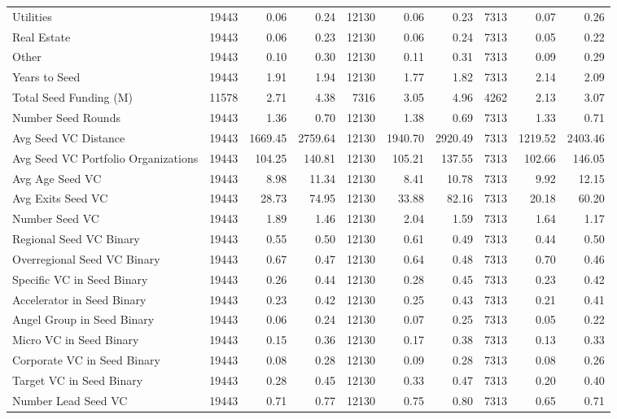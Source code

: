 {\begin{table}[!h]
{\begin{tabular}[t]{lrrrrrrrrr}
Utilities & 19443 & 0.06 & 0.24 & 12130 & 0.06 & 0.23 & 7313 & 0.07 & 0.26\\
Real Estate & 19443 & 0.06 & 0.23 & 12130 & 0.06 & 0.24 & 7313 & 0.05 & 0.22\\
Other & 19443 & 0.10 & 0.30 & 12130 & 0.11 & 0.31 & 7313 & 0.09 & 0.29\\
Years to Seed & 19443 & 1.91 & 1.94 & 12130 & 1.77 & 1.82 & 7313 & 2.14 & 2.09\\
\addlinespace
Total Seed Funding (M) & 11578 & 2.71 & 4.38 & 7316 & 3.05 & 4.96 & 4262 & 2.13 & 3.07\\
Number Seed Rounds & 19443 & 1.36 & 0.70 & 12130 & 1.38 & 0.69 & 7313 & 1.33 & 0.71\\
Avg Seed VC Distance & 19443 & 1669.45 & 2759.64 & 12130 & 1940.70 & 2920.49 & 7313 & 1219.52 & 2403.46\\
Avg Seed VC Portfolio Organizations & 19443 & 104.25 & 140.81 & 12130 & 105.21 & 137.55 & 7313 & 102.66 & 146.05\\
Avg Age Seed VC & 19443 & 8.98 & 11.34 & 12130 & 8.41 & 10.78 & 7313 & 9.92 & 12.15\\
\addlinespace
Avg Exits Seed VC & 19443 & 28.73 & 74.95 & 12130 & 33.88 & 82.16 & 7313 & 20.18 & 60.20\\
Number Seed VC & 19443 & 1.89 & 1.46 & 12130 & 2.04 & 1.59 & 7313 & 1.64 & 1.17\\
Regional Seed VC Binary & 19443 & 0.55 & 0.50 & 12130 & 0.61 & 0.49 & 7313 & 0.44 & 0.50\\
Overregional Seed VC Binary & 19443 & 0.67 & 0.47 & 12130 & 0.64 & 0.48 & 7313 & 0.70 & 0.46\\
Specific VC in Seed Binary & 19443 & 0.26 & 0.44 & 12130 & 0.28 & 0.45 & 7313 & 0.23 & 0.42\\
\addlinespace
Accelerator in Seed Binary & 19443 & 0.23 & 0.42 & 12130 & 0.25 & 0.43 & 7313 & 0.21 & 0.41\\
Angel Group in Seed Binary & 19443 & 0.06 & 0.24 & 12130 & 0.07 & 0.25 & 7313 & 0.05 & 0.22\\
Micro VC in Seed Binary & 19443 & 0.15 & 0.36 & 12130 & 0.17 & 0.38 & 7313 & 0.13 & 0.33\\
Corporate VC in Seed Binary & 19443 & 0.08 & 0.28 & 12130 & 0.09 & 0.28 & 7313 & 0.08 & 0.26\\
Target VC in Seed Binary & 19443 & 0.28 & 0.45 & 12130 & 0.33 & 0.47 & 7313 & 0.20 & 0.40\\
\addlinespace
Number Lead Seed VC & 19443 & 0.71 & 0.77 & 12130 & 0.75 & 0.80 & 7313 & 0.65 & 0.71\\

\end{tabular}}
\end{table}}
